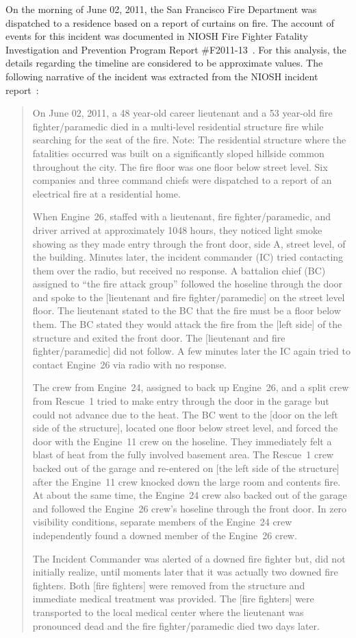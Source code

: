 \documentclass[12pt,oneside]{book}
\begin{document}
On the morning of June 02, 2011, the San Francisco Fire Department was dispatched to a residence based on a report of curtains on fire. The account of events for this incident was documented in NIOSH Fire Fighter Fatality Investigation and Prevention Program Report \#F2011-13~\cite{NIOSH:Bowyer2}. For this analysis, the details regarding the timeline are considered to be approximate values. The following narrative of the incident was extracted from the NIOSH incident report~\cite{NIOSH:Bowyer2}:
\begin{quote}
On June 02, 2011, a 48 year-old career lieutenant and a 53 year-old fire fighter/paramedic died in a multi-level residential structure fire while searching for the seat of the fire. Note: The residential structure where the fatalities occurred was built on a significantly sloped hillside common throughout the city. The fire floor was one floor below street level. Six companies and three command chiefs were dispatched to a report of an electrical fire at a residential home.

When Engine~26, staffed with a lieutenant, fire fighter/paramedic, and driver arrived at approximately 1048 hours, they noticed light smoke showing as they made entry through the front door, side A, street level, of the building. Minutes later, the incident commander (IC) tried contacting them over the radio, but received no response. A battalion chief (BC) assigned to ``the fire attack group'' followed the hoseline through the door and spoke to the [lieutenant and fire fighter/paramedic] on the street level floor. The lieutenant stated to the BC that the fire must be a floor below them. The BC stated they would attack the fire from the [left side] of the structure and exited the front door. The [lieutenant and fire fighter/paramedic] did not follow. A few minutes later the IC again tried to contact Engine~26 via radio with no response.

The crew from Engine~24, assigned to back up Engine~26, and a split crew from Rescue~1 tried to make entry through the door in the garage but could not advance due to the heat. The BC went to the [door on the left side of the structure], located one floor below street level, and forced the door with the Engine~11 crew on the hoseline. They immediately felt a blast of heat from the fully involved basement area. The Rescue~1 crew backed out of the garage and re-entered on [the left side of the structure] after the Engine~11 crew knocked down the large room and contents fire. At about the same time, the Engine~24 crew also backed out of the garage and followed the Engine~26 crew's hoseline through the front door. In zero visibility conditions, separate members of the Engine~24 crew independently found a downed member of the Engine~26 crew.

The Incident Commander was alerted of a downed fire fighter but, did not initially realize, until moments later that it was actually two downed fire fighters. Both [fire fighters] were removed from the structure and immediate medical treatment was provided. The [fire fighters] were transported to the local medical center where the lieutenant was pronounced dead and the fire fighter/paramedic died two days later.
\end{quote}
\end{document}
